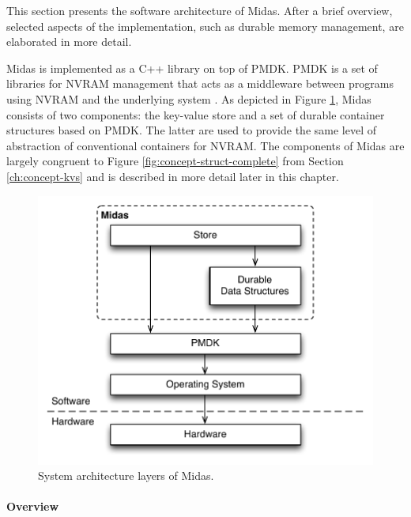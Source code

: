 
This section presents the software architecture of Midas. After a brief
overview, selected aspects of the implementation, such as durable memory
management, are elaborated in more detail.

Midas is implemented as a C++ library on top of PMDK. PMDK is a set of libraries
for NVRAM management that acts as a middleware between programs using NVRAM and
the underlying system \cite{rudoff2017persistent, pmdk2018home}. As depicted in
Figure \ref{fig:impl-arch}, Midas consists of two components: the key-value
store and a set of durable container structures based on PMDK. The latter are
used to provide the same level of abstraction of conventional containers for
NVRAM. The components of Midas are largely congruent to Figure
\ref{fig:concept-struct-complete} from Section \ref{ch:concept-kvs} and is
described in more detail later in this chapter.

\begin{figure}[h!]
    \centering
    \includegraphics[scale=0.75]{figures/impl/arch2.pdf}
    \caption{System architecture layers of Midas.}
    \label{fig:impl-arch}
\end{figure}

\paragraph{Overview}

